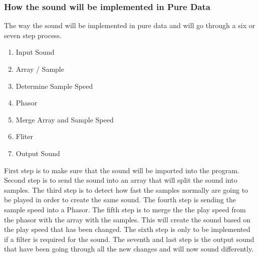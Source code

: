 

\subsubsection{How the sound will be implemented in Pure Data} %
\label{ssub:how_the_sound_will_be_implemented_in_pure_data}

The way the sound will be implemented in pure data and will go through a six or seven step process.

\begin{enumerate}
    \item Input Sound
    \item Array / Sample
    \item Determine Sample Speed
    \item Phasor
    \item Merge Array and Sample Speed
    \item Fliter
    \item Output Sound
\end{enumerate}

First step is to make sure that the sound will be imported into the program. 
Second step is to send the sound into an array that will split the sound into samples. 
The third step is to detect how fast the samples normally are going to be played in order to create the same sound. 
The fourth step is sending the sample speed into a Phasor. 
The fifth step is to merge the the play speed from the phasor with the array with the samples. 
This will create the sound based on the play speed that has been changed. 
The sixth step is only to be implemented if a filter is required for the sound. 
The seventh and last step is the output sound that have been going through all the new changes and will now sound differently.




